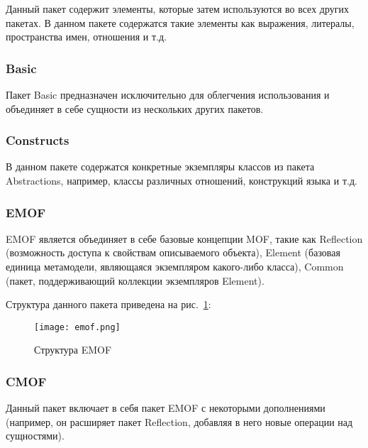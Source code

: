 Данный пакет содержит элементы, которые затем используются во всех других
пакетах. В данном пакете содержатся такие элементы как выражения, литералы,
пространства имен, отношения и т.д.

\subsubsection{Basic}

Пакет Basic предназначен исключительно для облегчения использования и объединяет
в себе сущности из нескольких других пакетов.

\subsubsection{Constructs}

В данном пакете содержатся конкретные экземпляры классов из пакета Abstractions,
например, классы различных отношений, конструкций языка и т.д.

\subsubsection{EMOF}


EMOF является объединяет в себе базовые концепции MOF, такие как Reflection
(возможность доступа к свойствам описываемого объекта), Element (базовая единица
метамодели, являющаяся экземпляром какого-либо класса), Common (пакет,
поддерживающий коллекции экземпляров Element).

Структура данного пакета приведена на рис.~\ref{fig:emof}:

\begin{figure}[h]
    \begin{center}
        \texttt{[image: emof.png]}
    \end{center}
    \caption{Структура EMOF}
    \label{fig:emof}
\end{figure}

\subsubsection{CMOF}


Данный пакет включает в себя пакет EMOF с некоторыми дополнениями  (например, он
расширяет пакет Reflection, добавляя в него новые операции над сущностями).

